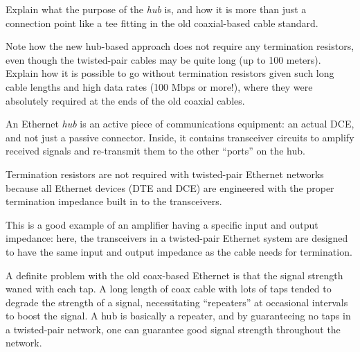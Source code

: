 Explain what the purpose of the {\it hub} is, and how it is more than just a connection point like a tee fitting in the old coaxial-based cable standard. 

Note how the new hub-based approach does not require any termination resistors, even though the twisted-pair cables may be quite long (up to 100 meters).  Explain how it is possible to go without termination resistors given such long cable lengths and high data rates (100 Mbps or more!), where they were absolutely required at the ends of the old coaxial cables.







An Ethernet {\it hub} is an active piece of communications equipment: an actual DCE, and not just a passive connector.  Inside, it contains transceiver circuits to amplify received signals and re-transmit them to the other ``ports'' on the hub.  

Termination resistors are not required with twisted-pair Ethernet networks because all Ethernet devices (DTE and DCE) are engineered with the proper termination impedance built in to the transceivers.







This is a good example of an amplifier having a specific input and output impedance: here, the transceivers in a twisted-pair Ethernet system are designed to have the same input and output impedance as the cable needs for termination.

A definite problem with the old coax-based Ethernet is that the signal strength waned with each tap.  A long length of coax cable with lots of taps tended to degrade the strength of a signal, necessitating ``repeaters'' at occasional intervals to boost the signal.  A hub is basically a repeater, and by guaranteeing no taps in a twisted-pair network, one can guarantee good signal strength throughout the network.




